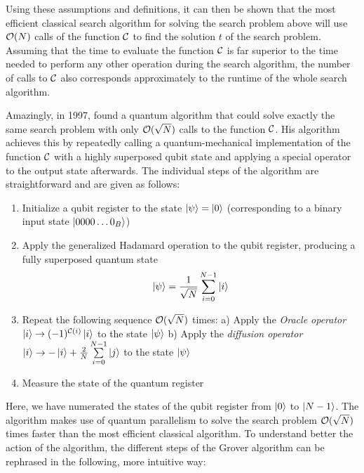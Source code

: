 \smallskip

Using these assumptions and definitions, it can then be shown that the most efficient classical search algorithm for solving the search problem above will use $\begin{mathcal}O\end{mathcal}(N)$ calls of the function $\Or$ to find the solution $t$ of the search problem. Assuming that the time to evaluate the function $\Or$ is far superior to the time needed to perform any other operation during the search algorithm, the number of calls to $\Or$ also corresponds approximately to the runtime of the whole search algorithm.

\smallskip

Amazingly, in 1997, \cite{Grover_Quantum_1997} found a quantum algorithm that could solve exactly the same search problem with only $\begin{mathcal}O\end{mathcal}(\sqrt{N})$ calls to the function $\Or$. His algorithm achieves this by repeatedly calling a quantum-mechanical implementation of the function $\Or$ with a highly superposed qubit state and applying a special operator to the output state afterwards. The individual steps of the algorithm are straightforward and are given as follows:

\begin{enumerate}
 \item Initialize a qubit register to the state $\left| \psi \right> = \left| 0 \right>$ (corresponding to a binary input state $\left| 0000\hdots0_B \right>$)
 \item Apply the generalized Hadamard operation to the qubit register, producing a fully superposed quantum state $$\left| \psi \right> = \frac{1}{\sqrt{N}}\sum\limits_{i=0}^{N-1} \left| i \right>$$
 \item Repeat the following sequence $\begin{mathcal}O\end{mathcal}(\sqrt{N})$ times:
 \subitem a) Apply the {\it Oracle operator} $\ket{i}\to (-1)^{\Or(i)}\ket{i}$ to the state $\left| \psi \right>$
 \subitem b) Apply the {\it diffusion operator} $\left| i \right> \to -\left| i \right>+\frac{2}{N}\sum\limits_{i=0}^{N-1}\left| j \right>$ to the state $\left| \psi \right>$
	\item Measure the state of the quantum register
\end{enumerate}

Here, we have numerated the states of the qubit register from $\left| 0 \right>$ to $\left| N-1 \right>$. The algorithm makes use of quantum parallelism to solve the search problem $\begin{mathcal}O\end{mathcal}(\sqrt{N})$ times faster than the most efficient classical algorithm. To understand better the action of the algorithm, the different steps of the Grover algorithm can be rephrased in the following, more intuitive way:

